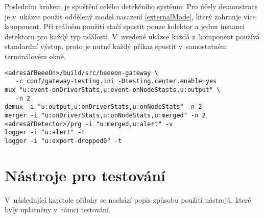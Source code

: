 \documentclass[thesis=M,czech]{FITthesis}[2012/06/26]
\begin{document}
\begin{enumerate}
Posledním krokem je spuštění celého detekčního systému. Pro účely demonstrace je
v~ukázce použit oddělený model nasazení \ref{externalMode}, který zahrnuje více komponent. Při reálném 
použití stačí spustit pouze kolektor a jednu instanci detektoru pro každý typ události. V~uvedené
ukázce každá z~komponent používá standardní výstup, proto je nutné každý příkaz spustit v~samostatném
terminálovém okně.
\begin{verbatim}
<adresářBeeeOn>/build/src/beeeon-gateway \
   -c conf/gateway-testing.ini -Dtesting.center.enable=yes 
mux "u:event-onDriverStats,u:event-onNodeStasts,u:output" \
   -n 2
demux -i "u:output,u:onDriverStats,u:onNodeStats" -n 2
merger -i "u:onDriverStats,u:onNodeStats,u:merged" -n 2
<adresářDetector>/prg -i "u:merged,u:alert" -v
logger -i "u:alert" -t
logger -i "u:export-dropped0" -t
\end{verbatim}
\end{enumerate}


\chapter{Nástroje pro testování}
V~následující kapitole přílohy se nachází popis způsobu použití nástrojů, které byly uplatněny 
v~rámci testování.
\end{document}
